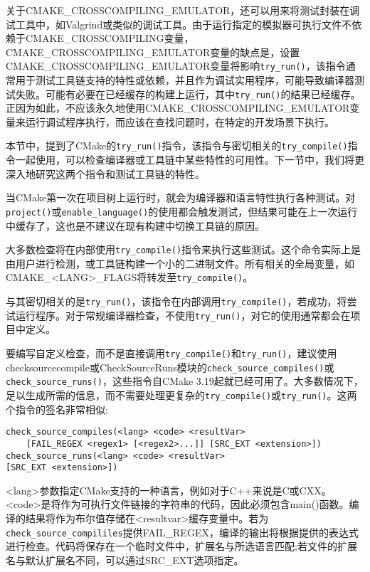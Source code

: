 关于CMAKE\_CROSSCOMPILING\_EMULATOR，还可以用来将测试封装在调试工具中，如Valgrind或类似的调试工具。由于运行指定的模拟器可执行文件不依赖于CMAKE\_CROSSCOMPILING变量，CMAKE\_CROSSCOMPILING\_EMULATOR变量的缺点是，设置CMAKE\_CROSSCOMPILING\_EMULATOR变量将影响\texttt{try\_run()}，该指令通常用于测试工具链支持的特性或依赖，并且作为调试实用程序，可能导致编译器测试失败。可能有必要在已经缓存的构建上运行，其中\texttt{try\_run()}的结果已经缓存。正因为如此，不应该永久地使用CMAKE\_CROSSCOMPILING\_EMULATOR变量来运行调试程序执行，而应该在查找问题时，在特定的开发场景下执行。

本节中，提到了CMake的\texttt{try\_run()}指令，该指令与密切相关的\texttt{try\_compile()}指令一起使用，可以检查编译器或工具链中某些特性的可用性。下一节中，我们将更深入地研究这两个指令和测试工具链的特性。


当CMake第一次在项目树上运行时，就会为编译器和语言特性执行各种测试。对\texttt{project()}或\texttt{enable\_language()}的使用都会触发测试，但结果可能在上一次运行中缓存了，这也是不建议在现有构建中切换工具链的原因。

大多数检查将在内部使用\texttt{try\_compile()}指令来执行这些测试。这个命令实际上是由用户进行检测，或工具链构建一个小的二进制文件。所有相关的全局变量，如CMAKE\_<LANG>\_FLAGS将转发至\texttt{try\_compile()}。

与其密切相关的是\texttt{try\_run()}，该指令在内部调用\texttt{try\_compile()}，若成功，将尝试运行程序。对于常规编译器检查，不使用\texttt{try\_run()}，对它的使用通常都会在项目中定义。

要编写自定义检查，而不是直接调用\texttt{try\_compile()}和\texttt{try\_run()}，建议使用checksourcecompile或CheckSourceRuns模块的\texttt{check\_source\_compiles()}或\texttt{check\_source\_runs()}，这些指令自CMake 3.19起就已经可用了。大多数情况下，足以生成所需的信息，而不需要处理更复杂的\texttt{try\_compile()}或\texttt{try\_run()}。这两个指令的签名非常相似:

\begin{lstlisting}[style=styleCMake]
check_source_compiles(<lang> <code> <resultVar>
	[FAIL_REGEX <regex1> [<regex2>...]] [SRC_EXT <extension>])
check_source_runs(<lang> <code> <resultVar>
[SRC_EXT <extension>])
\end{lstlisting}

<lang>参数指定CMake支持的一种语言，例如对于C++来说是C或CXX。<code>是将作为可执行文件链接的字符串的代码，因此必须包含main()函数。编译的结果将作为布尔值存储在<resultvar>缓存变量中。若为\texttt{check\_source\_compililes}提供FAIL\_REGEX，编译的输出将根据提供的表达式进行检查。代码将保存在一个临时文件中，扩展名与所选语言匹配;若文件的扩展名与默认扩展名不同，可以通过SRC\_EXT选项指定。

